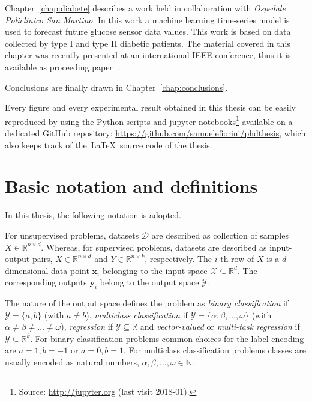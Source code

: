 Chapter~\ref{chap:diabete} describes a work held in collaboration with \textit{Ospedale Policlinico San Martino}. In this work a machine learning time-series model is used to forecast future glucose sensor data values. This work is based on data collected by type I and type II diabetic patients.
The material covered in this chapter was recently presented at an international IEEE conference, thus it is available as proceeding paper~\cite{fiorini2017data}.

Conclusions are finally drawn in Chapter~\ref{chap:conclusions}.

Every figure and every experimental result obtained in this thesis can be easily reproduced by using the Python scripts and {\sc jupyter}  notebooks\footnote{ Source: \url{http://jupyter.org} (last visit 2018-01).} available on a dedicated GitHub repository: \url{https://github.com/samuelefiorini/phdthesis}, which also keeps track of the~\LaTeX~source code of the thesis.

\chapter{Basic notation and definitions} \label{sec:notation}
In this thesis, the following notation is adopted.

For unsupervised problems, datasets $\mathcal{D}$ are described as collection of samples $X \in \mathbb{R}^{n \times d}$. Whereas, for supervised problems, datasets are described as input-output pairs, $X \in \mathbb{R}^{n \times d}$ and $Y \in \mathbb{R}^{n \times k}$, respectively.
The $i$-th row of $X$ is a $d$-dimensional data point $\bm{x}_{i}$ belonging to the input space $\mathcal{X}\subseteq\mathds{R}^d$. The corresponding outputs $\bm{y}_{i}$ belong to the output space $\mathcal{Y}$.

The nature of the output space defines the problem as \textit{binary classification} if  $\mathcal{Y} = \{a,b\}$ (with $a\neq b$), \textit{multiclass classification} if
$\mathcal{Y} = \{\alpha,\beta,\dots,\omega\}$
(with $\alpha \neq \beta \neq \dots \neq \omega$),
\textit{regression} if $\mathcal{Y}\subseteq\mathds{R}$ and
\textit{vector-valued} or \textit{multi-task regression} if $\mathcal{Y}\subseteq\mathds{R}^k$.
For binary classification problems common choices for the label encoding are $a=1, b=-1$ or $a=0, b=1$.
For multiclass classification problems classes are usually encoded as natural numbers, \ie $\alpha, \beta, \dots, \omega \in \mathbb{N}$.

